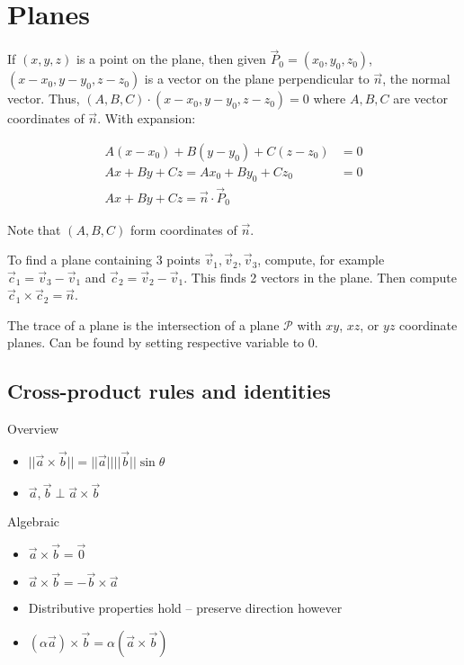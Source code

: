 \section{Planes}

If $(x,y,z)$ is a point on the plane, then given $\vec{P}_0=(x_0,y_0,z_0)$, $(x-x_0,y-y_0,z-z_0)$ is a vector on the plane perpendicular to $\vec{n}$, the
normal vector. Thus, $(A,B,C)\cdot(x-x_0,y-y_0,z-z_0)=0$ where $A,B,C$ are vector coordinates of $\vec{n}$. With expansion:

\begin{align*}
    A(x-x_0)+B(y-y_0)+C(z-z_0)&=0\\
    Ax+By+Cz=Ax_0+By_0+Cz_0&=0\\
    Ax+By+Cz=\vec{n}\cdot \vec{P}_0
\end{align*}

Note that $(A,B,C)$ form coordinates of $\vec{n}$.

To find a plane containing 3 points $\vec{v}_1,\vec{v}_2,\vec{v}_3$, compute, for example $\vec{c}_1=\vec{v}_3-\vec{v}_1$ and $\vec{c}_2=\vec{v}_2-\vec{v}_1$.
This finds 2 vectors in the plane. Then compute $\vec{c}_1\times \vec{c}_2=\vec{n}$. \newline

\noindent
The trace of a plane is the intersection of a plane $\mathcal{P}$ with $xy$, $xz$, or $yz$ coordinate planes. Can be found by setting respective variable to 0.
\subsection{Cross-product rules and identities}

Overview
\begin{itemize}
    \item $||\vec{a}\times \vec{b}||=||\vec{a}||||\vec{b}||\sin\theta$
    \item $\vec{a},\vec{b}\perp \vec{a}\times \vec{b}$
\end{itemize}

Algebraic
\begin{itemize}
    \item $\vec{a}\times \vec{b}=\vec{0}$
    \item $\vec{a}\times \vec{b}=-\vec{b}\times \vec{a}$
    \item Distributive properties hold -- preserve direction however
    \item $(\alpha \vec{a})\times \vec{b}=\alpha(\vec{a}\times \vec{b})$
\end{itemize}
